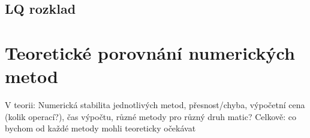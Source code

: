\documentclass{article}
\theoremstyle{plain}
\theoremstyle{definition}
\begin{document}
\subsection{LQ rozklad}

\section{Teoretické porovnání numerických metod}
V teorii: Numerická stabilita jednotlivých metod, přesnost/chyba, výpočetní cena (kolik operací?), čas výpočtu, různé metody pro různý druh matic?
Celkově: co bychom od každé metody mohli teoreticky očekávat
\end{document}
